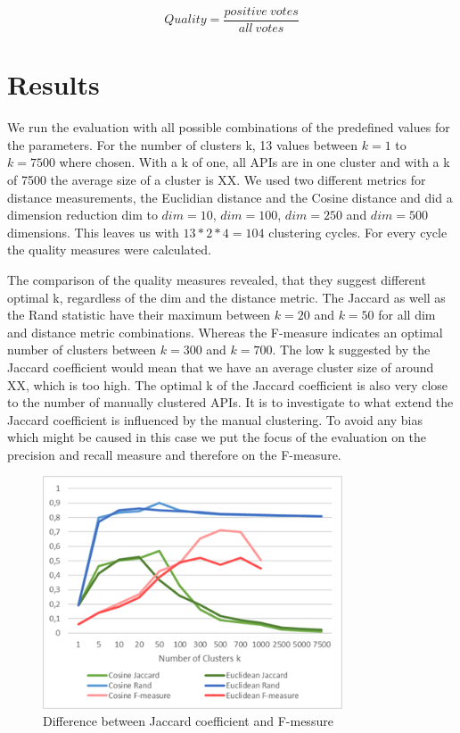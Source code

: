 \documentclass[a4paper]{IEEEtran}
\begin{document}
\begin{equation*}
Quality= \frac{positive~votes}{all~votes}
\end{equation*}

\section{Results}
We run the evaluation with all possible combinations of the predefined values for the parameters. For the number of clusters k, 13 values between $k=1$ to $k=7500$ where chosen. With a k of one, all APIs are in one cluster and with a k of 7500 the average size of a cluster is XX. We used two different metrics for distance measurements, the Euclidian distance and the Cosine distance and did a dimension reduction dim to $dim⁡= 10$, $dim⁡= 100$, $dim⁡=  250$ and  $dim⁡= 500$ dimensions. This leaves us with $13*2*4=104$ clustering cycles. For every cycle the quality measures were calculated.

The comparison of the quality measures revealed, that they suggest different optimal k, regardless of the dim and the distance metric. The Jaccard as well as the Rand statistic have their maximum between $k=20$ and $k=50$ for all dim and distance metric combinations. Whereas the F-measure indicates an optimal number of clusters between $k=300$ and $k=700$.
The low k suggested by the Jaccard coefficient would mean that we have an average cluster size of around XX, which is too high. The optimal k of the Jaccard coefficient is also very close to the number of manually clustered APIs. It is to investigate to what extend the Jaccard coefficient is influenced by the manual clustering. To avoid any bias which might be caused in this case we put the focus of the evaluation on the precision and recall measure and therefore on the F-measure.


\begin{figure}[!t]
\centering
\includegraphics[width= 3.5in]{img/Jaccard.png}
\caption{Difference between Jaccard coefficient and F-messure}
\label{fig_sim}
\end{figure}
\end{document}
